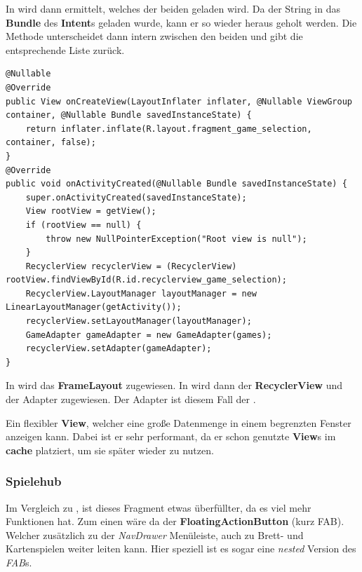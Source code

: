 In  wird dann ermittelt, welches der beiden geladen wird.
Da der String in das \textbf{Bundle} des \textbf{Intent}s geladen wurde, kann
er so wieder heraus geholt werden. Die Methode 
unterscheidet dann intern zwischen den beiden und gibt die entsprechende Liste
zurück.\\

\begin{lstlisting}[caption={GameSelection onCreateView() \& onActivityCreated() Methode},
captionpos=b]
@Nullable
@Override
public View onCreateView(LayoutInflater inflater, @Nullable ViewGroup container, @Nullable Bundle savedInstanceState) {
	return inflater.inflate(R.layout.fragment_game_selection, container, false);
}
@Override
public void onActivityCreated(@Nullable Bundle savedInstanceState) {
	super.onActivityCreated(savedInstanceState);
	View rootView = getView();
	if (rootView == null) {
		throw new NullPointerException("Root view is null");
	}
	RecyclerView recyclerView = (RecyclerView) rootView.findViewById(R.id.recyclerview_game_selection);
	RecyclerView.LayoutManager layoutManager = new LinearLayoutManager(getActivity());
	recyclerView.setLayoutManager(layoutManager);
	GameAdapter gameAdapter = new GameAdapter(games);
	recyclerView.setAdapter(gameAdapter);
}
\end{lstlisting}

In  wird das \textbf{FrameLayout} zugewiesen. In
 wird dann der \textbf{RecyclerView} und der
Adapter zugewiesen. Der Adapter ist diesem Fall der .

\begin{infobox}[frametitle=RecyclerView]
Ein flexibler \textbf{View}, welcher eine große Datenmenge in einem begrenzten
Fenster anzeigen kann. Dabei ist er sehr performant, da er schon genutzte
\textbf{View}s im \textbf{cache} platziert, um sie später wieder zu nutzen. 
\end{infobox}

\subsubsection{Spielehub}

Im Vergleich zu , ist dieses Fragment etwas überfüllter, da
es viel mehr Funktionen hat. Zum einen wäre da der \textbf{FloatingActionButton}
(kurz FAB). Welcher zusätzlich zu der \emph{NavDrawer} Menüleiste, auch zu
Brett- und Kartenspielen weiter leiten kann. Hier speziell ist es sogar eine
\emph{nested} Version des \emph{FAB}s.

